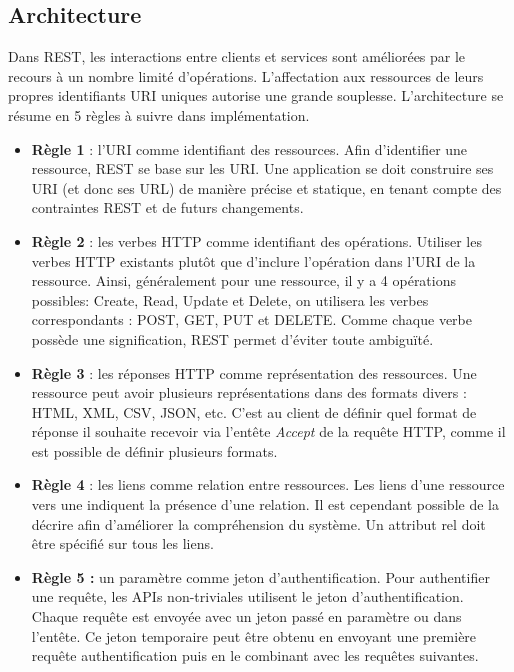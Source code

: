 \subsection{Architecture}
Dans REST, les interactions entre clients et services sont améliorées par le recours à un nombre limité d'opérations. L'affectation aux ressources de leurs propres identifiants URI uniques autorise une grande souplesse. L'architecture se résume en 5 règles à suivre dans implémentation.\cite{refRegles}
\begin{itemize}
	\item \textbf{Règle 1} : l'URI comme identifiant des ressources.\newline
	      Afin d'identifier une ressource, REST se base sur les URI. Une application se doit construire ses URI (et donc ses URL) de manière précise et statique, en tenant compte des contraintes REST et de futurs changements.
	\item \textbf{Règle 2} : les verbes HTTP comme identifiant des opérations.\newline
	      Utiliser les verbes HTTP existants plutôt que d'inclure l'opération dans l'URI de la ressource. Ainsi, généralement pour une ressource, il y a 4 opérations possibles: Create, Read, Update et Delete, on utilisera les verbes correspondants : POST, GET, PUT et DELETE.
	      Comme chaque verbe possède une signification, REST permet d'éviter toute ambiguïté.
	\item \textbf{Règle 3} : les réponses HTTP comme représentation des ressources.\newline
	      Une ressource peut avoir plusieurs représentations dans des formats divers : HTML, XML, CSV, JSON, etc. C'est au client de définir quel format de réponse il souhaite recevoir via l'entête \emph{Accept} de la requête HTTP, comme il est possible de définir plusieurs formats.
	\item \textbf{Règle 4} : les liens comme relation entre ressources.\newline
	      Les liens d'une ressource vers une indiquent la présence d'une relation. Il est cependant possible de la décrire afin d'améliorer la compréhension du système. Un attribut rel doit être spécifié sur tous les liens.
	\item \textbf{Règle 5 :} un paramètre comme jeton d'authentification.\newline
	      Pour authentifier une requête, les APIs non-triviales utilisent le jeton d'authentification. Chaque requête est envoyée avec un jeton passé en paramètre ou dans l'entête. Ce jeton temporaire peut être obtenu en envoyant une première requête authentification puis en le combinant avec les requêtes suivantes.
\end{itemize}
